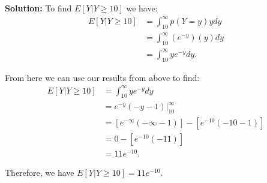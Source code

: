 \documentclass[a4paper]{article}
\begin{document}
\textbf{Solution:} To find $E[Y | Y \geq 10]$ we have:
\begin{align*}
  E[Y | Y \geq 10] &= \int_{10}^\infty p(Y=y) y dy\\
  &= \int_{10}^\infty (e^{-y})(y) dy\\
  &= \int_{10}^\infty ye^{-y} dy.
\end{align*}

From here we can use our results from above to find:
\begin{align*}
  E[Y | Y \geq 10] &= \int_{10}^\infty ye^{-y} dy\\
  &= e^{-y} (-y-1) \Big|_{10}^\infty\\
  &= [e^{-\infty} (-\infty-1)] - [e^{-10} (-10-1)]\\
  &= 0 - [e^{-10} (-11)]\\
  &= 11e^{-10}.
\end{align*}

Therefore, we have $E[Y | Y \geq 10] = 11e^{-10}$.
\end{document}
